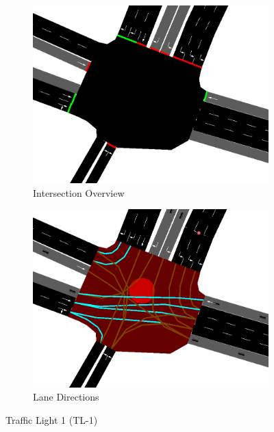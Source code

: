 \begin{figure}[h]
    \centering
    \begin{subfigure}{0.45\textwidth}
        \centering
        \includegraphics[width=\linewidth]{images/methodology/tl-1-street.png}
        \caption{Intersection Overview}
    \end{subfigure}
    \hfill
    \begin{subfigure}{0.45\textwidth}
        \centering
        \includegraphics[width=\linewidth]{images/methodology/tl-1-directions.png}
        \caption{Lane Directions}
    \end{subfigure}
    \caption{Traffic Light 1 (TL-1)}
    \label{fig:tl-1}
\end{figure}

